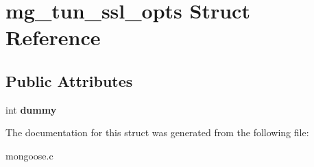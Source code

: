 \hypertarget{structmg__tun__ssl__opts}{}\section{mg\+\_\+tun\+\_\+ssl\+\_\+opts Struct Reference}
\label{structmg__tun__ssl__opts}
\subsection*{Public Attributes}
\begin{DoxyCompactItemize}
\item 
\mbox{\label{structmg__tun__ssl__opts_ae2b8a40a2d19ae76a510bf99b2cc4da8}} 
int {\bfseries dummy}
\end{DoxyCompactItemize}


The documentation for this struct was generated from the following file\+:\begin{DoxyCompactItemize}
\item 
mongoose.\+c\end{DoxyCompactItemize}
